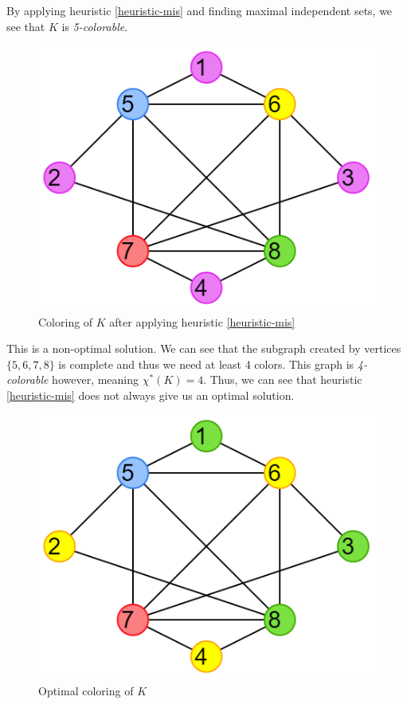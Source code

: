 \documentclass{article}
\newcounter{heuristic} \setcounter{heuristic}{0}
\theoremstyle{definition}
\begin{document}
By applying heuristic \ref{heuristic-mis} and finding maximal independent sets, we see that \(K\) is \emph{5-colorable}.

\begin{figure}[H]
\centering
\includegraphics[scale=0.38]{images/mis-2.png}
\caption{Coloring of \(K\) after applying heuristic \ref{heuristic-mis}}
\end{figure}

This is a non-optimal solution. We can see that the subgraph created by vertices \(\{5, 6, 7, 8\}\) is complete and thus we need at least 4 colors. This graph is \emph{4-colorable} however, meaning \(\chi^{*}(K) = 4\). Thus, we can see that heuristic \ref{heuristic-mis} does not always give us an optimal solution.

\begin{figure}[H]
\centering
\includegraphics[scale=0.38]{images/mis-3.png}
\caption{Optimal coloring of \(K\)}
\end{figure}
\end{document}
